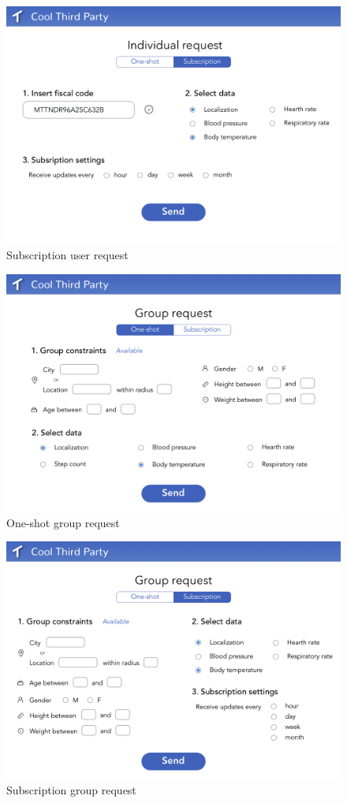 \begin{figure}[H]
    \centering
    \includegraphics[scale=0.2]{Pictures/Mockup/web/individual2.png}
    \caption{Subscription user request}
\end{figure}
\begin{figure}[H]
    \centering
    \includegraphics[scale=0.2]{rasdL/Pictures/Mockup/web/group1.png}
    \caption{One-shot group request}
\end{figure}
\begin{figure}[H]
    \centering
    \includegraphics[scale=0.2]{Pictures/Mockup/web/group2.png}
    \caption{Subscription group request}
\end{figure}
